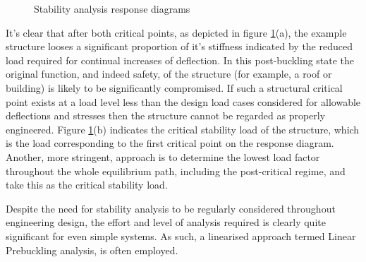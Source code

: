 \begin{figure}[H]
	\caption{\label{stab1}Stability analysis response diagrams \cite{FelippaStabilityBasics2016}}
\end{figure}

It's clear that after both critical points, as depicted in figure \ref{stab1}(a), the example structure looses a significant proportion of it's stiffness indicated by the reduced load required for continual increases of deflection. In this post-buckling state the original function, and indeed safety, of the structure (for example, a roof or building) is likely to be significantly compromised. If such a structural critical point exists at a load level less than the design load cases considered for allowable deflections and stresses then the structure cannot be regarded as properly engineered. Figure \ref{stab1}(b) indicates the critical stability load of the structure, which is the load corresponding to the first critical point on the response diagram. Another, more stringent, approach is to determine the lowest load factor throughout the whole equilibrium path, including the post-critical regime, and take this as the critical stability load.

Despite the need for stability analysis to be regularly considered throughout engineering design, the effort and level of analysis required is clearly quite significant for even simple systems. As such, a linearised approach termed Linear Prebuckling analysis, is often employed.

